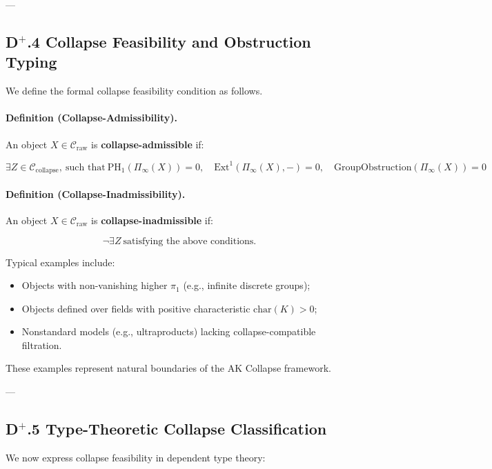 \documentclass[11pt]{article}
\begin{document}
---

\subsection*{D$^{+}$.4 Collapse Feasibility and Obstruction Typing}

We define the formal collapse feasibility condition as follows.

\paragraph{Definition (Collapse-Admissibility).}

An object \( X \in \mathcal{C}_{\mathrm{raw}} \) is \textbf{collapse-admissible} if:

\[
\exists Z \in \mathcal{C}_{\mathrm{collapse}},\ \text{such that}\ 
\mathrm{PH}_1(\Pi_\infty(X)) = 0,\quad
\mathrm{Ext}^1(\Pi_\infty(X), -) = 0,\quad
\mathrm{GroupObstruction}(\Pi_\infty(X)) = 0
\]

\paragraph{Definition (Collapse-Inadmissibility).}

An object \( X \in \mathcal{C}_{\mathrm{raw}} \) is \textbf{collapse-inadmissible} if:

\[
\neg \exists Z\ \text{satisfying the above conditions}.
\]

Typical examples include:

\begin{itemize}
    \item Objects with non-vanishing higher $\pi_1$ (e.g., infinite discrete groups);
    \item Objects defined over fields with positive characteristic \( \mathrm{char}(K) > 0 \);
    \item Nonstandard models (e.g., ultraproducts) lacking collapse-compatible filtration.
\end{itemize}

These examples represent natural boundaries of the AK Collapse framework.

---

\subsection*{D$^{+}$.5 Type-Theoretic Collapse Classification}

We now express collapse feasibility in dependent type theory:
\end{document}

